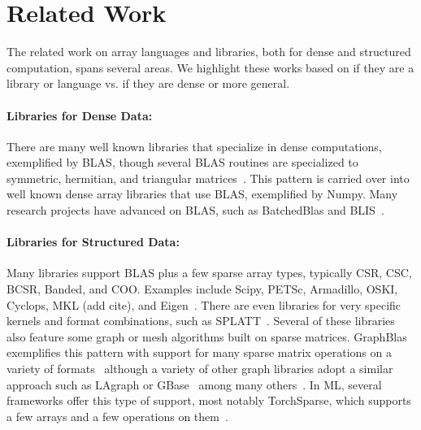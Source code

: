 \section{Related Work}

The related work on array languages and libraries, both for dense and structured computation, spans several areas.
%
We highlight these works based on if they are a library or language vs. if they are dense or more general.

\paragraph{Libraries for Dense Data:} There are many well known libraries that specialize in dense computations, exemplified by BLAS, though several BLAS routines are specialized to symmetric, hermitian, and triangular matrices~\cite{Anderson1999}.
%
This pattern is carried over into well known dense array libraries that use BLAS, exemplified by Numpy.
%
Many research projects have advanced on BLAS, such as BatchedBlas and BLIS~\cite{dongarra2017design, van2015blis}.

\paragraph{Libraries for Structured Data:}

Many libraries support BLAS plus a few sparse array types, typically CSR, CSC, BCSR, Banded, and COO.
%
Examples include Scipy, PETSc, Armadillo, OSKI, Cyclops, MKL (add cite), and Eigen~\cite{virtanen2020scipy, abhyankarpetsc, Rumengan2021, vuduc2005oski,solomonik2013cyclops, eigenweb}.
%
There are even libraries for very specific kernels and format combinations, such as SPLATT~\cite{smith2015splatt}.
%
Several of these libraries also feature some graph or mesh algorithms built on sparse matrices.
%
GraphBlas exemplifies this pattern with support for many sparse matrix operations on a variety of formats~\cite{kepner2016mathematical} although a variety of other graph libraries adopt a similar approach such as LAgraph or GBase~\cite{mattson2019lagraph, kang2011gbase} among many others~\cite{ashari2014fast,huang2020ge}.
%
In ML, several frameworks offer this type of support, most notably TorchSparse, which supports a few arrays and a few operations on them~\cite{tang2022torchsparse, tang2023torchsparse++}.
%


